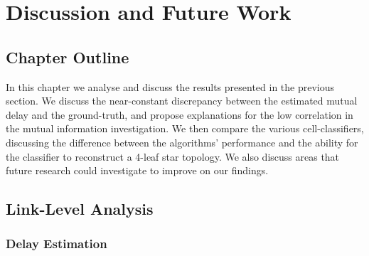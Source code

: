 \chapter{Discussion and Future Work}
\label{chap:disc}
\section*{Chapter Outline}
In this chapter we analyse and discuss the results presented in the previous section. We discuss the near-constant discrepancy between the estimated mutual delay and the ground-truth, and propose explanations for the low correlation in the mutual information investigation. We then compare the various cell-classifiers, discussing the difference between the algorithms' performance and the ability for the classifier to reconstruct a 4-leaf star topology. We also discuss areas that future research could investigate to improve on our findings. 


\section{Link-Level Analysis}
\subsection{Delay Estimation}



